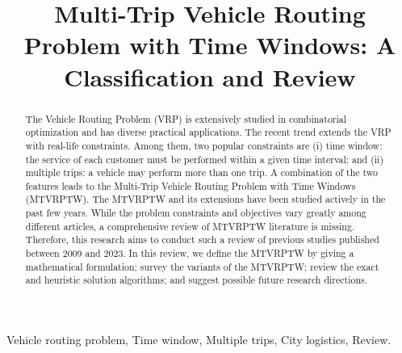 \documentclass[lettersize,journal]{IEEEtran}
\begin{document}
\title{Multi-Trip Vehicle Routing Problem with Time Windows: A Classification and Review}

\maketitle


\begin{abstract}
    The Vehicle Routing Problem (VRP) is extensively studied in combinatorial optimization and has diverse practical applications. The recent trend extends the VRP with real-life constraints.  Among them, two popular constraints are (i) time window: the service of each customer must be performed within a given time interval; and (ii) multiple trips: a vehicle may perform more than one trip.  A combination of the two features leads to the Multi-Trip Vehicle Routing Problem with Time Windows (MTVRPTW). The MTVRPTW and its extensions have been studied actively in the past few years.  While the problem constraints and objectives vary greatly among different articles, a comprehensive review of MTVRPTW literature is missing.  Therefore, this research aims to conduct such a review of previous studies published between 2009 and 2023.  In this review, we define the MTVRPTW by giving a mathematical formulation; survey the variants of the MTVRPTW; review the exact and heuristic solution algorithms; and suggest possible future research directions.
\end{abstract}

\begin{IEEEkeywords}
    Vehicle routing problem, Time window, Multiple trips, City logistics, Review.
\end{IEEEkeywords}










\end{document}

